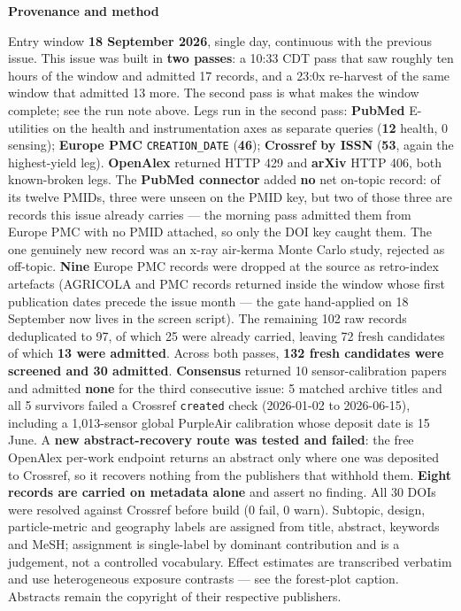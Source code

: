 \documentclass[10pt]{article}
\begin{document}


\vspace{4mm}
\begin{keybox}
{\sffamily\bfseries\footnotesize\color{Deep}Provenance and method}\\[1.2mm]
{\fontsize{7.2}{8.8}\selectfont
Entry window \textbf{18 September 2026}, single day, continuous with the previous issue.
This issue was built in \textbf{two passes}: a 10:33 CDT pass that saw roughly ten hours of
the window and admitted 17 records, and a 23:0x re-harvest of the same window that admitted
13 more. The second pass is what makes the window complete; see the run note above.
Legs run in the second pass: \textbf{PubMed} E-utilities on the health and instrumentation
axes as separate queries (\textbf{12} health, 0 sensing); \textbf{Europe PMC}
\texttt{CREATION\_DATE} (\textbf{46}); \textbf{Crossref by ISSN} (\textbf{53}, again the
highest-yield leg). \textbf{OpenAlex} returned HTTP 429 and \textbf{arXiv} HTTP 406, both
known-broken legs. The \textbf{PubMed connector} added \textbf{no} net on-topic record: of
its twelve PMIDs, three were unseen on the PMID key, but two of those three are records this
issue already carries --- the morning pass admitted them from Europe PMC with no PMID
attached, so only the DOI key caught them. The one genuinely new record was an x-ray
air-kerma Monte Carlo study, rejected as off-topic.
\textbf{Nine} Europe PMC records were dropped at the source as retro-index artefacts
(AGRICOLA and PMC records returned inside the window whose first publication dates precede
the issue month --- the gate hand-applied on 18 September now lives in the screen script).
The remaining 102 raw records deduplicated to 97, of which 25 were already carried, leaving
72 fresh candidates of which \textbf{13 were admitted}. Across both passes, \textbf{132 fresh candidates were screened and 30 admitted}.
\textbf{Consensus} returned 10 sensor-calibration papers and admitted \textbf{none} for the
third consecutive issue: 5 matched archive titles and all 5 survivors failed a Crossref
\texttt{created} check (2026-01-02 to 2026-06-15), including a 1,013-sensor global PurpleAir
calibration whose deposit date is 15 June. A \textbf{new abstract-recovery route was tested
and failed}: the free OpenAlex per-work endpoint returns an abstract only where one was
deposited to Crossref, so it recovers nothing from the publishers that withhold them.
\textbf{Eight records are carried on metadata alone} and assert no finding. All 30 DOIs
were resolved against Crossref before build (0 fail, 0 warn).
Subtopic, design, particle-metric and geography labels are assigned from title, abstract,
keywords and MeSH; assignment is single-label by dominant contribution and is a judgement,
not a controlled vocabulary. Effect estimates are transcribed verbatim and use
heterogeneous exposure contrasts --- see the forest-plot caption.
Abstracts remain the copyright of their respective publishers.\par}
\end{keybox}
\end{document}
